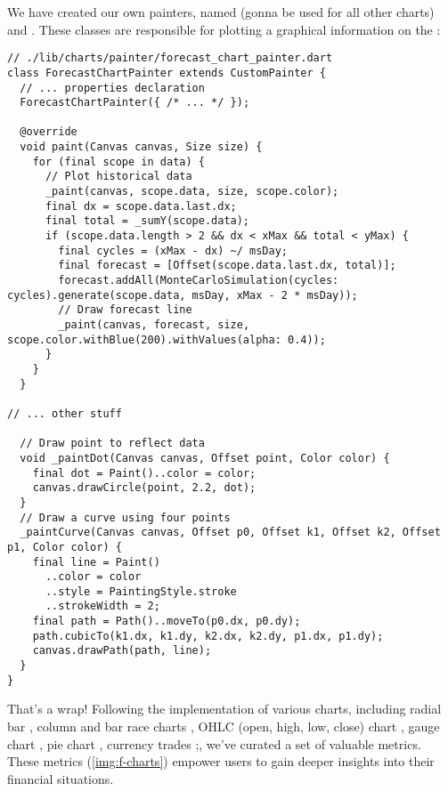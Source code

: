\noindent We have created our own painters, named  (gonna be used for all other charts) and 
. These classes are responsible for plotting a graphical information on the :

\begin{lstlisting}
// ./lib/charts/painter/forecast_chart_painter.dart
class ForecastChartPainter extends CustomPainter {
  // ... properties declaration
  ForecastChartPainter({ /* ... */ });

  @override
  void paint(Canvas canvas, Size size) {
    for (final scope in data) {
      // Plot historical data
      _paint(canvas, scope.data, size, scope.color);
      final dx = scope.data.last.dx;
      final total = _sumY(scope.data);
      if (scope.data.length > 2 && dx < xMax && total < yMax) {
        final cycles = (xMax - dx) ~/ msDay;
        final forecast = [Offset(scope.data.last.dx, total)];
        forecast.addAll(MonteCarloSimulation(cycles: cycles).generate(scope.data, msDay, xMax - 2 * msDay));
        // Draw forecast line
        _paint(canvas, forecast, size, scope.color.withBlue(200).withValues(alpha: 0.4));
      }
    }
  }

// ... other stuff

  // Draw point to reflect data
  void _paintDot(Canvas canvas, Offset point, Color color) {
    final dot = Paint()..color = color;
    canvas.drawCircle(point, 2.2, dot);
  }
  // Draw a curve using four points
  _paintCurve(Canvas canvas, Offset p0, Offset k1, Offset k2, Offset p1, Color color) {
    final line = Paint()
      ..color = color
      ..style = PaintingStyle.stroke
      ..strokeWidth = 2;
    final path = Path()..moveTo(p0.dx, p0.dy);
    path.cubicTo(k1.dx, k1.dy, k2.dx, k2.dy, p1.dx, p1.dy);
    canvas.drawPath(path, line);
  }
}
\end{lstlisting}

\noindent That's a wrap! Following the implementation of various charts, including radial bar , column 
and bar race charts , OHLC (open, high, low, close) chart , gauge chart  
, pie chart , currency trades ;, we've curated a set of valuable metrics. 
These metrics (\cref{img:f-charts}) empower users to gain deeper insights into their financial situations.

